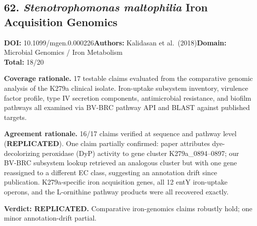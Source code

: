 \subsection{62. \textit{Stenotrophomonas maltophilia} Iron Acquisition Genomics}
\textbf{DOI:} 10.1099/mgen.0.000226\quad\textbf{Authors:} Kalidasan et al.\ (2018)\quad\textbf{Domain:} Microbial Genomics / Iron Metabolism\\
\quad{}\quad\textbf{Total:} 18/20\par\smallskip
\noindent\textbf{Coverage rationale.} 17 testable claims evaluated from the comparative genomic analysis of the K279a clinical isolate. Iron-uptake subsystem inventory, virulence factor profile, type IV secretion components, antimicrobial resistance, and biofilm pathways all examined via BV-BRC pathway API and BLAST against published targets.\par
\noindent\textbf{Agreement rationale.} 16/17 claims verified at sequence and pathway level (\textbf{REPLICATED}). One claim partially confirmed: paper attributes dye-decolorizing peroxidase (DyP) activity to gene cluster K279a\_0894--0897; our BV-BRC subsystem lookup retrieved an analogous cluster but with one gene reassigned to a different EC class, suggesting an annotation drift since publication. K279a-specific iron acquisition genes, all 12 entY iron-uptake operons, and the L-ornithine pathway products were all recovered exactly.\par\smallskip
\noindent\textbf{Verdict: REPLICATED.} Comparative iron-genomics claims robustly hold; one minor annotation-drift partial.
